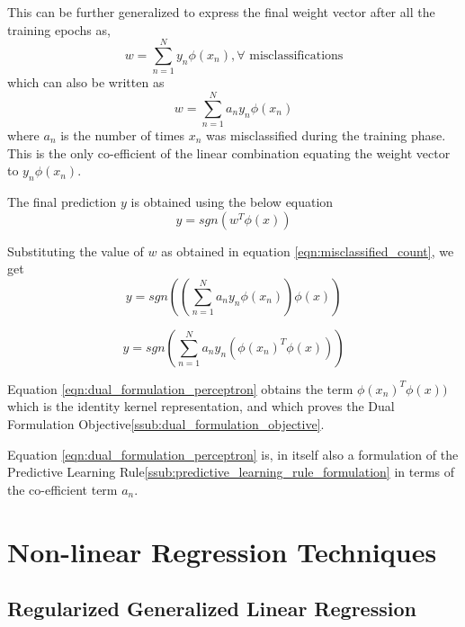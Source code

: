 \documentclass[parskip=full]{scrartcl}
\begin{document}
        This can be further generalized to express the final weight vector after all the training epochs as,
        $$w = \sum_{n=1}^N y_n \phi(x_n), \forall \text{ misclassifications}$$
        which can also be written as
        \begin{equation} \label{eqn:misclassified_count}
            w = \sum_{n=1}^N a_n y_n \phi(x_n)            
        \end{equation}
        where $a_n$ is the number of times $x_n$ was misclassified during the training phase. This is the only co-efficient of the linear combination equating the weight vector to $y_n \phi(x_n)$.

        The final prediction $y$ is obtained using the below equation
        $$y = sgn(w^T \phi(x)) $$

        Substituting the value of $w$ as obtained in equation \ref{eqn:misclassified_count}, we get
        $$y = sgn((\sum_{n=1}^N a_n y_n \phi(x_n)) \phi(x)) $$

        \begin{equation} \label{eqn:dual_formulation_perceptron}
            y = sgn(\sum_{n=1}^N a_n y_n (\phi(x_n)^T \phi(x)))            
        \end{equation}

        Equation \ref{eqn:dual_formulation_perceptron} obtains the term $\phi(x_n)^T \phi(x))$ which is the identity kernel representation, and which proves the Dual Formulation Objective\ref{ssub:dual_formulation_objective}.

        Equation \ref{eqn:dual_formulation_perceptron} is, in itself also a formulation of the Predictive Learning Rule\ref{ssub:predictive_learning_rule_formulation} in terms of the co-efficient term $a_n$.
    



\newpage


\section{Non-linear Regression Techniques} %
\label{sec:non_linear_regression_techniques}

    \subsection{Regularized Generalized Linear Regression} %
    \label{sub:regularized_generalized_linear_regression}
    
\end{document}
